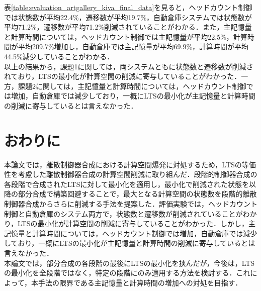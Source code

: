 \documentclass[technicalreport]{ieicej}
\begin{document}
表\ref{table:evaluation_artgallery_kiva_final_data}を見ると，ヘッドカウント制御では状態数が平均22.4\%，遷移数が平均19.7\%，自動倉庫システムでは状態数が平均71.2\%，遷移数が平均71.2\%削減されていることがわかる．また，主記憶量と計算時間については，ヘッドカウント制御では主記憶量が平均22.5\%，計算時間が平均209.7\%増加し，自動倉庫では主記憶量が平均69.9\%，計算時間が平均44.5\%減少していることがわかる．\\
\indent
以上の結果から，課題1に関しては，両システムともに状態数と遷移数が削減されており，LTSの最小化が計算空間の削減に寄与していることがわかった．一方，課題2に関しては，主記憶量と計算時間については，ヘッドカウント制御では増加，自動倉庫では減少しており，一概にLTSの最小化が主記憶量と計算時間の削減に寄与しているとは言えなかった．


\section{おわりに}
本論文では，離散制御器合成における計算空間爆発に対処するため，LTSの等価性を考慮した離散制御器合成の計算空間削減に取り組んだ．段階的制御器合成の各段階で合成されたLTSに対して最小化を適用し，最小化で削減された状態を以降の部分合成で構築回避することで，最大となる計算空間の状態数を段階的離散制御器合成からさらに削減する手法を提案した．評価実験では，ヘッドカウント制御と自動倉庫のシステム両方で，状態数と遷移数が削減されていることがわかり，LTSの最小化が計算空間の削減に寄与していることがわかった．しかし，主記憶量と計算時間については，ヘッドカウント制御では増加，自動倉庫では減少しており，一概にLTSの最小化が主記憶量と計算時間の削減に寄与しているとは言えなかった．\\
\indent
本論文では，部分合成の各段階の最後にLTSの最小化を挟んだが，今後は，LTS の最小化を全段階ではなく，特定の段階にのみ適用する方法を検討する．これによって，本手法の限界である主記憶量と計算時間の増加への対処を目指す．


\newpage
\end{document}
